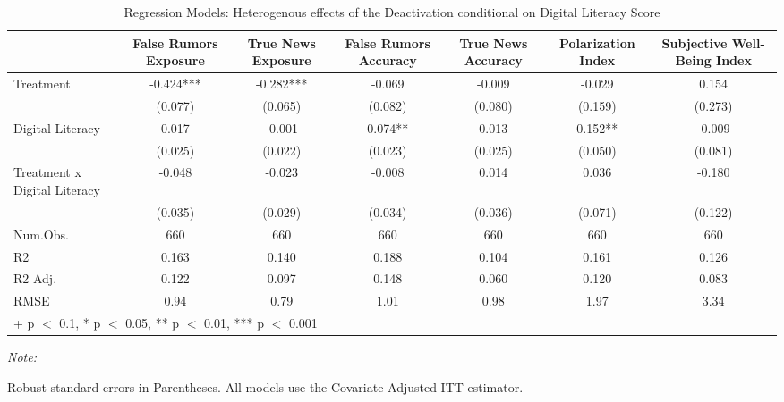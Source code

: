 \begin{table}

\caption{Regression Models: Heterogenous effects of the Deactivation conditional on Digital Literacy Score }
\centering
\begin{threeparttable}
\begin{tabular}[t]{lcccccc}
\toprule
  & False Rumors Exposure & True News Exposure & False Rumors Accuracy & True News Accuracy & Polarization Index & Subjective Well-Being Index\\
\midrule
Treatment & -0.424*** & -0.282*** & -0.069 & -0.009 & -0.029 & 0.154\\
 & (0.077) & (0.065) & (0.082) & (0.080) & (0.159) & (0.273)\\
Digital Literacy & 0.017 & -0.001 & 0.074** & 0.013 & 0.152** & -0.009\\
 & (0.025) & (0.022) & (0.023) & (0.025) & (0.050) & (0.081)\\
Treatment x Digital Literacy & -0.048 & -0.023 & -0.008 & 0.014 & 0.036 & -0.180\\
 & (0.035) & (0.029) & (0.034) & (0.036) & (0.071) & (0.122)\\
\midrule
Num.Obs. & 660 & 660 & 660 & 660 & 660 & 660\\
R2 & 0.163 & 0.140 & 0.188 & 0.104 & 0.161 & 0.126\\
R2 Adj. & 0.122 & 0.097 & 0.148 & 0.060 & 0.120 & 0.083\\
RMSE & 0.94 & 0.79 & 1.01 & 0.98 & 1.97 & 3.34\\
\bottomrule
\multicolumn{7}{l}{\rule{0pt}{1em}+ p $<$ 0.1, * p $<$ 0.05, ** p $<$ 0.01, *** p $<$ 0.001}\\
\end{tabular}
\begin{tablenotes}
\item \textit{Note: } 
\item  Robust standard errors in Parentheses. All models use the Covariate-Adjusted ITT estimator. 
\end{tablenotes}
\end{threeparttable}
\end{table}
